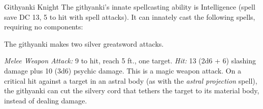 \documentclass[10pt,a4paper,twoside,bg=print,twocolumn,openany,nodeprecatedcode]{dndbook}
\begin{document}
\begin{DndMonster}[float=t]{Githyanki Knight}
\DndMonsterBasics[
armor-class = {18 (\textit{plate armor})},
hit-points = {\DndDice{14d8 + 28}},
speed = {30 ft.}
]
\DndMonsterAbilityScores[
 str = 16,
 dex = 14,
 con = 15,
 int = 14,
 wis = 14,
 cha = 15
]
\DndMonsterDetails[
saving-throws = {Con +5, Int +5, Wis +5},
languages = {Gith},
challenge = 8,
]
The githyanki's innate spellcasting ability is Intelligence (spell save DC 13, 5 to hit with spell attacks). It can innately cast the following spells, requiring no components:
\begin{DndMonsterSpells}
\end{DndMonsterSpells}
The githyanki makes two silver greatsword attacks.

\textsl{Melee Weapon Attack:} 9 to hit, reach 5 ft., one target. \textsl{Hit:} 13 (2d6 + 6) slashing damage plus 10 (3d6) psychic damage. This is a magic weapon attack. On a critical hit against a target in an astral body (as with the \textit{astral projection} spell), the githyanki can cut the silvery cord that tethers the target to its material body, instead of dealing damage.

\end{DndMonster}
\end{document}
